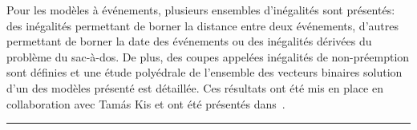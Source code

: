 \begin{center}
\begin{minipage}{\textwidth}
{      Pour les modèles à événements, plusieurs ensembles d'inégalités
      sont présentés: des inégalités permettant de borner la distance
      entre deux événements, d'autres permettant de borner la date des
      événements ou des inégalités dérivées du problème du
      sac-à-dos. De plus, des coupes appelées inégalités de
      non-préemption sont définies et une étude polyédrale de
      l'ensemble des vecteurs binaires solution d'un des modèles
      présenté est détaillée. Ces résultats ont été mis en place en
      collaboration avec Tam{\'a}s Kis et ont été présentés 
      dans~\cite{Nattaf_ROADEF16,Nattaf_ECCO16,LAASreport}. }
    \vspace{0.5cm}
    \hrule
  \end{minipage}
\end{center}

 

